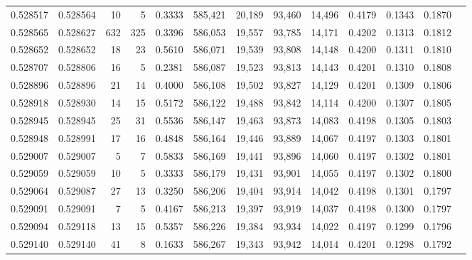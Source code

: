 \begin{tabular}{rrrrrrrrrrrrr}
0.528517 & 0.528564 &    10 &     5 &                                     0.3333 & 585,421 &  20,189 &  93,460 &  14,496 & 0.4179 & 0.1343 & 0.1870 \\
0.528565 & 0.528627 &   632 &   325 &                                     0.3396 & 586,053 &  19,557 &  93,785 &  14,171 & 0.4202 & 0.1313 & 0.1812 \\
0.528652 & 0.528652 &    18 &    23 &                                     0.5610 & 586,071 &  19,539 &  93,808 &  14,148 & 0.4200 & 0.1311 & 0.1810 \\
0.528707 & 0.528806 &    16 &     5 &                                     0.2381 & 586,087 &  19,523 &  93,813 &  14,143 & 0.4201 & 0.1310 & 0.1808 \\
0.528896 & 0.528896 &    21 &    14 &                                     0.4000 & 586,108 &  19,502 &  93,827 &  14,129 & 0.4201 & 0.1309 & 0.1806 \\
0.528918 & 0.528930 &    14 &    15 &                                     0.5172 & 586,122 &  19,488 &  93,842 &  14,114 & 0.4200 & 0.1307 & 0.1805 \\
0.528945 & 0.528945 &    25 &    31 &                                     0.5536 & 586,147 &  19,463 &  93,873 &  14,083 & 0.4198 & 0.1305 & 0.1803 \\
0.528948 & 0.528991 &    17 &    16 &                                     0.4848 & 586,164 &  19,446 &  93,889 &  14,067 & 0.4197 & 0.1303 & 0.1801 \\
0.529007 & 0.529007 &     5 &     7 &                                     0.5833 & 586,169 &  19,441 &  93,896 &  14,060 & 0.4197 & 0.1302 & 0.1801 \\
0.529059 & 0.529059 &    10 &     5 &                                     0.3333 & 586,179 &  19,431 &  93,901 &  14,055 & 0.4197 & 0.1302 & 0.1800 \\
0.529064 & 0.529087 &    27 &    13 &                                     0.3250 & 586,206 &  19,404 &  93,914 &  14,042 & 0.4198 & 0.1301 & 0.1797 \\
0.529091 & 0.529091 &     7 &     5 &                                     0.4167 & 586,213 &  19,397 &  93,919 &  14,037 & 0.4198 & 0.1300 & 0.1797 \\
0.529094 & 0.529118 &    13 &    15 &                                     0.5357 & 586,226 &  19,384 &  93,934 &  14,022 & 0.4197 & 0.1299 & 0.1796 \\
0.529140 & 0.529140 &    41 &     8 &                                     0.1633 & 586,267 &  19,343 &  93,942 &  14,014 & 0.4201 & 0.1298 & 0.1792 \\

\end{tabular}
